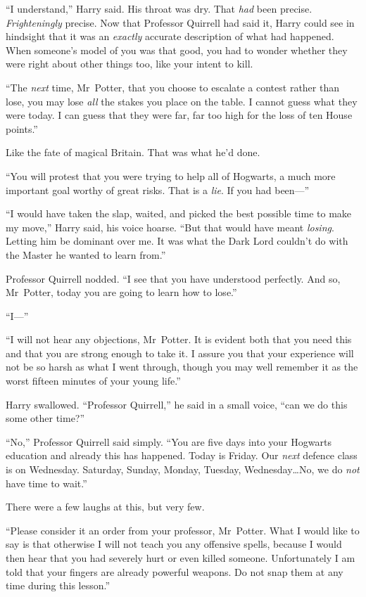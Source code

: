 “I understand,” Harry said. His throat was dry. That \emph{had} been precise. \emph{Frighteningly} precise. Now that Professor Quirrell had said it, Harry could see in hindsight that it was an \emph{exactly} accurate description of what had happened. When someone’s model of you was that good, you had to wonder whether they were right about other things too, like your intent to kill.

“The \emph{next} time, Mr~Potter, that you choose to escalate a contest rather than lose, you may lose \emph{all} the stakes you place on the table. I cannot guess what they were today. I can guess that they were far, far too high for the loss of ten House points.”

Like the fate of magical Britain. That was what he’d done.

“You will protest that you were trying to help all of Hogwarts, a much more important goal worthy of great risks. That is a \emph{lie}. If you had been—”

“I would have taken the slap, waited, and picked the best possible time to make my move,” Harry said, his voice hoarse. “But that would have meant \emph{losing}. Letting him be dominant over me. It was what the Dark Lord couldn’t do with the Master he wanted to learn from.”

Professor Quirrell nodded. “I see that you have understood perfectly. And so, Mr~Potter, today you are going to learn how to lose.”

“I—”

“I will not hear any objections, Mr~Potter. It is evident both that you need this and that you are strong enough to take it. I assure you that your experience will not be so harsh as what I went through, though you may well remember it as the worst fifteen minutes of your young life.”

Harry swallowed. “Professor Quirrell,” he said in a small voice, “can we do this some other time?”

“No,” Professor Quirrell said simply. “You are five days into your Hogwarts education and already this has happened. Today is Friday. Our \emph{next} defence class is on Wednesday. Saturday, Sunday, Monday, Tuesday, Wednesday…No, we do \emph{not} have time to wait.”

There were a few laughs at this, but very few.

“Please consider it an order from your professor, Mr~Potter. What I would like to say is that otherwise I will not teach you any offensive spells, because I would then hear that you had severely hurt or even killed someone. Unfortunately I am told that your fingers are already powerful weapons. Do not snap them at any time during this lesson.”

